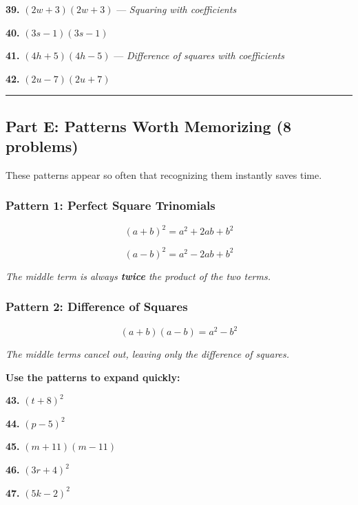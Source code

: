 \documentclass[
  11pt,
]{article}
\begin{document}
\textbf{39.} \((2w + 3)(2w + 3)\) --- \emph{Squaring with coefficients}

\textbf{40.} \((3s - 1)(3s - 1)\)

\textbf{41.} \((4h + 5)(4h - 5)\) --- \emph{Difference of squares with
coefficients}

\textbf{42.} \((2u - 7)(2u + 7)\)

\begin{center}\rule{0.5\linewidth}{0.5pt}\end{center}

\hypertarget{part-e-patterns-worth-memorizing-8-problems}{%
\subsection{Part E: Patterns Worth Memorizing (8
problems)}\label{part-e-patterns-worth-memorizing-8-problems}}

These patterns appear so often that recognizing them instantly saves
time.

\hypertarget{pattern-1-perfect-square-trinomials}{%
\subsubsection{Pattern 1: Perfect Square
Trinomials}\label{pattern-1-perfect-square-trinomials}}

\[\boxed{(a + b)^2 = a^2 + 2ab + b^2}\]

\[\boxed{(a - b)^2 = a^2 - 2ab + b^2}\]

\emph{The middle term is always \textbf{twice} the product of the two
terms.}

\hypertarget{pattern-2-difference-of-squares}{%
\subsubsection{Pattern 2: Difference of
Squares}\label{pattern-2-difference-of-squares}}

\[\boxed{(a + b)(a - b) = a^2 - b^2}\]

\emph{The middle terms cancel out, leaving only the difference of
squares.}

\textbf{Use the patterns to expand quickly:}

\textbf{43.} \((t + 8)^2\)

\textbf{44.} \((p - 5)^2\)

\textbf{45.} \((m + 11)(m - 11)\)

\textbf{46.} \((3r + 4)^2\)

\textbf{47.} \((5k - 2)^2\)
\end{document}
